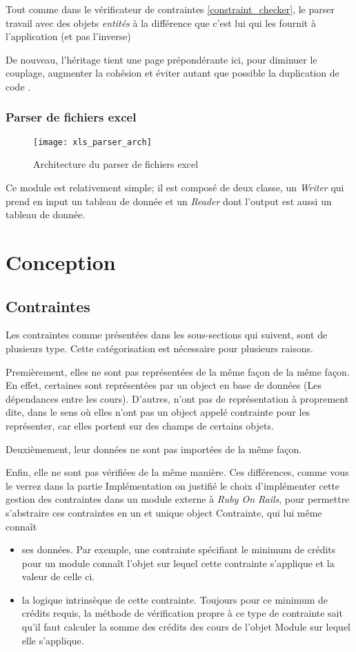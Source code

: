Tout comme dans le vérificateur de contraintes \ref{constraint_checker}, le parser travail avec des objets \textit{entités} à la différence que c'est lui qui les fournit à l'application (et pas l'inverse)

De nouveau, l'héritage tient une page prépondérante ici, pour diminuer le couplage, augmenter la cohésion  et éviter autant que possible la duplication de code \cite{cohesion_couplage}. 

\subsubsection{Parser de fichiers excel}
\label{xls_parser}
\begin{figure}[H]
\centering
\caption{Architecture du parser de fichiers excel}
\label{xls_parser_arch}
\texttt{[image: xls\_parser\_arch]}
\end{figure}

Ce module est relativement simple; il est composé de deux classe, un \textit{Writer} qui prend en input un tableau de donnée et un \textit{Reader} dont l'output est aussi un tableau de donnée.


\clearpage
\section{Conception}
\subsection{Contraintes}
Les contraintes comme présentées dans les sous-sections qui suivent, sont de plusieurs type. Cette catégorisation est nécessaire pour plusieurs raisons. 

Premièrement, elles ne sont pas représentées de la même façon de la même façon. En effet, certaines sont représentées par un object en base de données (Les dépendances entre les cours). D'autres, n'ont pas de représentation à proprement dite, dans le sens où elles n'ont pas un object appelé contrainte pour les représenter, car elles portent sur des champs de certains objets. 

Deuxièmement, leur données ne sont pas importées de la même façon. 

Enfin, elle ne sont pas vérifiées de la même manière. Ces différences, comme vous le verrez dans la partie Implémentation on justifié le choix d'implémenter cette gestion des contraintes dans un module externe à \textit{Ruby On Rails}, pour permettre s'abstraire ces contraintes en un et unique object Contrainte, qui lui même connaît
\begin{itemize}
\item ses données. Par exemple, une contrainte spécifiant le minimum de crédits pour un module connaît l'objet sur lequel cette contrainte s'applique et la valeur de celle ci.
\item la logique intrinsèque de cette contrainte. Toujours pour ce minimum de crédits requis, la méthode de vérification propre à ce type de contrainte sait qu'il faut calculer la somme des crédits des cours de l'objet Module sur lequel elle s'applique. 
\end{itemize}    
